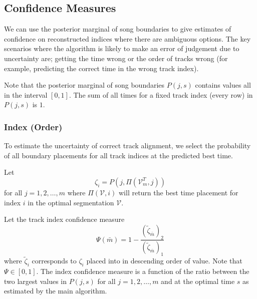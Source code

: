 \documentclass[twocolumn]{article}
\newcommand{\best}{\mathcal V}
\begin{document}
\subsection{Confidence Measures}

We can use the posterior marginal of song boundaries to give estimates of confidence on reconstructed indices where there are ambiguous options. The key scenarios where the algorithm is likely to make an error of judgement due to uncertainty are; getting the time wrong or the order of tracks wrong (for example, predicting the correct time in the wrong track index).

Note that the posterior marginal of song boundaries $P(j,s)$ contains values all in the interval $[0,1]$. The sum of all times for a fixed track index (every row) in $P(j,s)$ is $1$.

\subsubsection{Index (Order)}

To estimate the uncertainty of correct track alignment, we select the probability of all boundary placements for all track indices at the predicted best time. 

Let 
\[
\zeta_{ i} = P\left( j, \Pi\left(\best^T_m,j\right)  \right)
\] for all $j=1,2,\ldots,m$ where $\Pi(\best,i)$ will return the best time placement for index $i$ in the optimal segmentation $\best$.

Let the track index confidence measure 
\[
\Psi(\bar m)= 1- \frac{ \left(\tilde \zeta_{\bar m}\right) _2 }{ \left(\tilde \zeta_{\bar m}\right)_1 }
\] where $\tilde \zeta_{i}$ corresponds to $\zeta_{i}$ placed into in descending order of value. Note that $\Psi \in [0,1]$. The index confidence measure is a function of the ratio between the two largest values in $P(j,s)$ for all $j=1,2,\ldots,m$ and at the optimal time $s$ as estimated by the main algorithm. 
\end{document}
